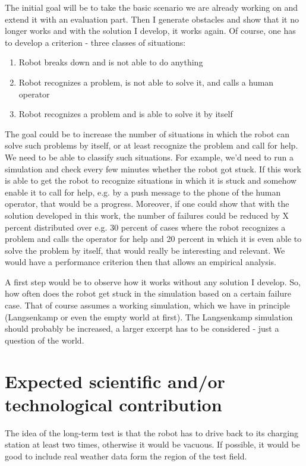 \documentclass[german, master, expose, latin1]{base/thesis_KBS}
\begin{document}
The initial goal will be to take the basic scenario we are already working on and extend it with an evaluation part. Then I generate obstacles and show that it no
longer works and with the solution I develop, it works again. Of course, one has to develop a criterion - three classes of situations:
\begin{enumerate}
    \item Robot breaks down and is not able to do anything
    \item Robot recognizes a problem, is not able to solve it, and calls a human operator
    \item Robot recognizes a problem and is able to solve it by itself
\end{enumerate}

The goal could be to increase the number of situations in which the robot can solve such problems by itself, or at least recognize the problem and call for help.
We need to be able to classify such situations. For example, we'd need to run a simulation and check every few minutes whether the robot got stuck.
If this work is able to get the robot to recognize situations in which it is stuck and somehow enable it to call for help, e.g. by a push message to
the phone of the human operator, that would be a progress. Moreover, if one could show that with the solution developed in this work, the number of failures
could be reduced by X percent distributed over e.g. 30 percent of cases where the robot recognizes a problem and calls the operator for help and 20 percent in which
it is even able to solve the problem by itself, that would really be interesting and relevant. We would have a performance criterion then that allows 
an empirical analysis.\newline

A first step would be to observe how it works without any solution I develop. So, how often does the robot get stuck in the simulation based on a certain failure
case. That of course assumes a working simulation, which we have in principle (Langsenkamp or even the empty world at first). The Langsenkamp simulation should
probably be increased, a larger excerpt has to be considered - just a question of the world.

\section{Expected scientific and/or technological contribution}

The idea of the long-term test is that the robot has to drive back to its charging station at least two times, otherwise it would be vacuous.
If possible, it would be good to include real weather data form the region of the test field.\newline
\end{document}
